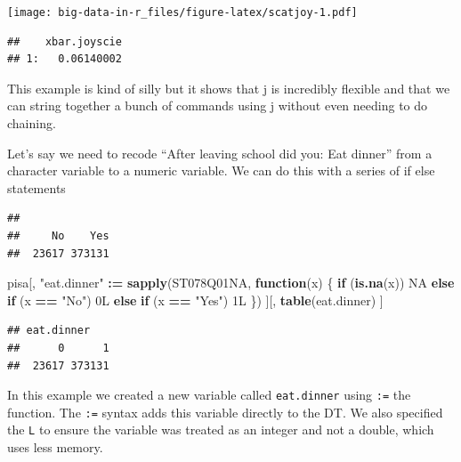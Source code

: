 \documentclass[]{book}
\newenvironment{Shaded}{\begin{snugshade}}{\end{snugshade}}
\newcommand{\ControlFlowTok}[1]{\textcolor[rgb]{0.13,0.29,0.53}{\textbf{#1}}}
\newcommand{\ErrorTok}[1]{\textcolor[rgb]{0.64,0.00,0.00}{\textbf{#1}}}
\newcommand{\KeywordTok}[1]{\textcolor[rgb]{0.13,0.29,0.53}{\textbf{#1}}}
\newcommand{\NormalTok}[1]{#1}
\newcommand{\OperatorTok}[1]{\textcolor[rgb]{0.81,0.36,0.00}{\textbf{#1}}}
\newcommand{\OtherTok}[1]{\textcolor[rgb]{0.56,0.35,0.01}{#1}}
\newcommand{\StringTok}[1]{\textcolor[rgb]{0.31,0.60,0.02}{#1}}
\begin{document}
\texttt{[image: big-data-in-r\_files/figure-latex/scatjoy-1.pdf]}

\begin{verbatim}
##    xbar.joyscie
## 1:   0.06140002
\end{verbatim}

This example is kind of silly but it shows that j is incredibly flexible and that we can string together a bunch of commands using j without even needing to do chaining.

Let's say we need to recode ``After leaving school did you: Eat dinner'' from a character variable to a numeric variable. We can do this with a series of if else statements

\begin{Shaded}
\end{Shaded}

\begin{verbatim}
## 
##     No    Yes 
##  23617 373131
\end{verbatim}

\begin{Shaded}
\begin{Highlighting}[]
\NormalTok{pisa[,}
     \StringTok{"eat.dinner"} \OperatorTok{:}\ErrorTok{=}\StringTok{ }\KeywordTok{sapply}\NormalTok{(ST078Q01NA,}
                            \ControlFlowTok{function}\NormalTok{(x) \{}
                              \ControlFlowTok{if}\NormalTok{ (}\KeywordTok{is.na}\NormalTok{(x)) }\OtherTok{NA}
                              \ControlFlowTok{else} \ControlFlowTok{if}\NormalTok{ (x }\OperatorTok{==}\StringTok{ "No"}\NormalTok{) 0L}
                              \ControlFlowTok{else} \ControlFlowTok{if}\NormalTok{ (x }\OperatorTok{==}\StringTok{ "Yes"}\NormalTok{) 1L}
\NormalTok{                            \})}
\NormalTok{     ][,}
       \KeywordTok{table}\NormalTok{(eat.dinner)}
\NormalTok{       ]}
\end{Highlighting}
\end{Shaded}

\begin{verbatim}
## eat.dinner
##      0      1 
##  23617 373131
\end{verbatim}

In this example we created a new variable called \texttt{eat.dinner} using \texttt{:=} the function. The \texttt{:=} syntax adds this variable directly to the DT. We also specified the \texttt{L} to ensure the variable was treated as an integer and not a double, which uses less memory.
\end{document}
